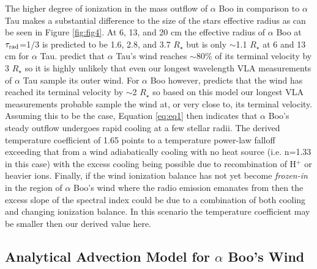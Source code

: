 \documentclass[iop]{emulateapj}
\begin{document}
The higher degree of ionization in the mass outflow of $\alpha$ Boo in comparison to $\alpha$ Tau makes a substantial difference to the size of the stars effective radius as can be seen in Figure \ref{fig:fig4}. At 6, 13, and 20 cm the effective radius of $\alpha$ Boo at $\tau _{\rm{rad}}$=1/3 is predicted to be 1.6, 2.8, and 3.7 $R_{\star}$ but is only $\sim$1.1 $R_{\star}$ at 6 and 13 cm for $\alpha$ Tau. \cite{1998ApJ...503..396R} predict that $\alpha$ Tau's wind reaches $\sim$80\% of its terminal velocity by 3 $R_{\star}$ so it is highly unlikely that even our longest wavelength VLA measurements of $\alpha$ Tau sample its outer wind. For $\alpha$ Boo however, \cite{1985pssl.proc..351D} predicts that the wind has reached its terminal velocity by $\sim$2 $R_{\star}$ so based on this model our longest VLA measurements probable sample the wind at, or very close to, its terminal velocity. Assuming this to be the case, Equation \ref{eq:eq1} then indicates that $\alpha$ Boo's steady outflow undergoes rapid cooling at a few stellar radii. The derived temperature coefficient of 1.65 points to a temperature power-law falloff exceeding that from a wind adiabatically cooling with no heat source (i.e. n=1.33 in this case) with the excess cooling being possible due to recombination of H$^{+}$ or heavier ions. Finally, if the wind ionization balance has not yet become \textit{frozen-in} in the region of $\alpha$ Boo's wind where the radio emission emanates from then the excess slope of the spectral index could be due to a combination of both cooling and changing ionization balance. In this scenario the temperature coefficient may be smaller then our derived value here.

\subsection{Analytical Advection Model for $\alpha$ Boo's Wind} \label{disc:disc4}
\end{document}
